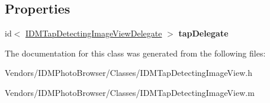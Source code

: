 \subsection*{Properties}
\begin{DoxyCompactItemize}
\item 
\hypertarget{interface_i_d_m_tap_detecting_image_view_a2a7629bbe9ec2396e9c08619676a6c9f}{}id$<$ \hyperlink{protocol_i_d_m_tap_detecting_image_view_delegate-p}{I\+D\+M\+Tap\+Detecting\+Image\+View\+Delegate} $>$ {\bfseries tap\+Delegate}\label{interface_i_d_m_tap_detecting_image_view_a2a7629bbe9ec2396e9c08619676a6c9f}

\end{DoxyCompactItemize}


The documentation for this class was generated from the following files\+:\begin{DoxyCompactItemize}
\item 
Vendors/\+I\+D\+M\+Photo\+Browser/\+Classes/I\+D\+M\+Tap\+Detecting\+Image\+View.\+h\item 
Vendors/\+I\+D\+M\+Photo\+Browser/\+Classes/I\+D\+M\+Tap\+Detecting\+Image\+View.\+m\end{DoxyCompactItemize}
